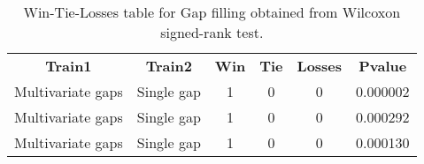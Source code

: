 \begin{table}
\centering
\caption{Win-Tie-Losses table for Gap filling obtained from Wilcoxon signed-rank test.}
\label{tab:gap_filling_training_data_comparison}
\begin{tabular}{|c|c|c|c|c|c|}
\toprule
   \textbf{Train1} & \textbf{Train2} &  \textbf{Win} &  \textbf{Tie} &  \textbf{Losses} &  \textbf{Pvalue} \\
 Multivariate gaps &      Single gap &             1 &             0 &                0 &         0.000002 \\
\midrule
 Multivariate gaps &      Single gap &             1 &             0 &                0 &         0.000292 \\
 Multivariate gaps &      Single gap &             1 &             0 &                0 &         0.000130 \\
\bottomrule
\end{tabular}
\end{table}
